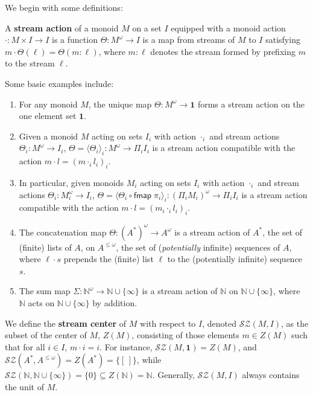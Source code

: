 \documentclass[acmsmall,screen,review]{acmart}
\newcommand{\mc}[1]{\ensuremath{\mathcal{#1}}}
\newcommand{\ms}[1]{\ensuremath{\mathsf{#1}}}
\newcommand{\nats}{\mathbb{N}}
\begin{document}
We begin with some definitions:
\begin{definition}
  A \textbf{stream action} of a monoid \(M\) on a set \(I\) equipped with a monoid action \(\cdot: M \times I \to I\) is a function \(\Theta: M^\omega \to I\) is a map from streams of \(M\) to \(I\) satisfying
  \(
    m \cdot \Theta(\ell) = \Theta(m \colon \ell)
  \),
  where \(m \colon \ell\) denotes the stream formed by prefixing \(m\) to the stream \(\ell\).
\end{definition}
Some basic examples include:
\begin{enumerate}
  \item For any monoid \(M\), the unique map \(\Theta: M^\omega \to \mathbf{1}\) forms a stream action on the one element set \(\mathbf{1}\).
  \item Given a monoid \(M\) acting on sets \(I_i\) with action \(\cdot_i\) and stream actions \(\Theta_i: M^\omega \to I_i\), \(\Theta = \langle\Theta_i\rangle_i: M^\omega \to \Pi_iI_i\) is a stream action compatible with the action \(m \cdot l = (m \cdot_i l_i)_i\).
  \item In particular, given monoids \(M_i\) acting on sets \(I_i\) with action \(\cdot_i\) and stream actions \(\Theta_i: M_i^\omega \to I_i\), \(\Theta = \langle \Theta_i \circ \ms{fmap}\;\pi_i\rangle_i: (\Pi_iM_i)^\omega \to \Pi_iI_i\) is a stream action compatible with the action \(m \cdot l = (m_i \cdot_i l_i)_i\).
  \item The concatenation map \(\Theta: (A^*)^\omega \to A^\omega\) is a stream action of \(A^*\), the set of (finite) lists of \(A\), on \(A^{\leq \omega}\), the set of (\textit{potentially} infinite) sequences of \(A\), where \(\ell \cdot s\) prepends the (finite) list \(\ell\) to the (potentially infinite) sequence \(s\).
  \item The sum map \(\Sigma: \nats^\omega \to \nats \cup \{\infty\}\) is a stream action of \(\nats\) on \(\nats \cup \{\infty\}\), where \(\nats\) acts on \(\nats \cup \{\infty\}\) by addition.
\end{enumerate}
We define the \textbf{stream center} of \(M\) with respect to \(I\), denoted \(\mc{SZ}(M, I)\), as the subset of the center of \(M\), \(Z(M)\), consisting of those elements \(m \in Z(M)\) such that for all \(i \in I\), \(m \cdot i = i\). For instance, \(\mc{SZ}(M, \mathbf{1}) = Z(M)\), and \(\mc{SZ}(A^*, A^{\leq \omega}) = Z(A^*) = \{[\,]\}\), while \(\mc{SZ}(\nats, \nats \cup \{\infty\}) = \{0\} \subseteq Z(\nats) = \nats\). Generally, \(\mc{SZ}(M, I)\) always contains the unit of \(M\).
\end{document}
